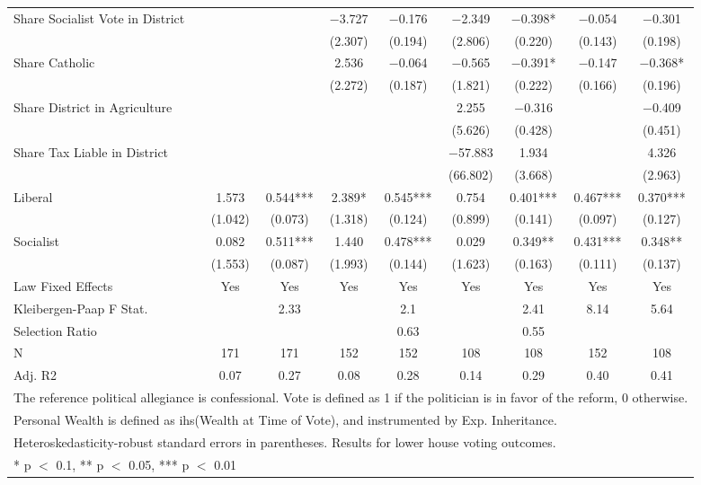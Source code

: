 \begin{table}[!h]
{\begin{tabular}[t]{lcccccccc}
Share Socialist Vote in District &  &  & \num{-3.727} & \num{-0.176} & \num{-2.349} & \num{-0.398}* & \num{-0.054} & \num{-0.301}\\
 &  &  & (\num{2.307}) & (\num{0.194}) & (\num{2.806}) & (\num{0.220}) & (\num{0.143}) & (\num{0.198})\\
Share Catholic &  &  & \num{2.536} & \num{-0.064} & \num{-0.565} & \num{-0.391}* & \num{-0.147} & \num{-0.368}*\\
 &  &  & (\num{2.272}) & (\num{0.187}) & (\num{1.821}) & (\num{0.222}) & (\num{0.166}) & (\num{0.196})\\
Share District in Agriculture &  &  &  &  & \num{2.255} & \num{-0.316} &  & \num{-0.409}\\
 &  &  &  &  & (\num{5.626}) & (\num{0.428}) &  & (\num{0.451})\\
Share Tax Liable in District &  &  &  &  & \num{-57.883} & \num{1.934} &  & \num{4.326}\\
 &  &  &  &  & (\num{66.802}) & (\num{3.668}) &  & (\num{2.963})\\
Liberal & \num{1.573} & \num{0.544}*** & \num{2.389}* & \num{0.545}*** & \num{0.754} & \num{0.401}*** & \num{0.467}*** & \num{0.370}***\\
 & (\num{1.042}) & (\num{0.073}) & (\num{1.318}) & (\num{0.124}) & (\num{0.899}) & (\num{0.141}) & (\num{0.097}) & (\num{0.127})\\
Socialist & \num{0.082} & \num{0.511}*** & \num{1.440} & \num{0.478}*** & \num{0.029} & \num{0.349}** & \num{0.431}*** & \num{0.348}**\\
 & (\num{1.553}) & (\num{0.087}) & (\num{1.993}) & (\num{0.144}) & (\num{1.623}) & (\num{0.163}) & (\num{0.111}) & (\num{0.137})\\
\midrule
Law Fixed Effects & Yes & Yes & Yes & Yes & Yes & Yes & Yes & Yes\\
Kleibergen-Paap F Stat. &  & 2.33 &  & 2.1 &  & 2.41 & 8.14 & 5.64\\
Selection Ratio &  &  &  & 0.63 &  & 0.55 &  & \\
N & \num{171} & \num{171} & \num{152} & \num{152} & \num{108} & \num{108} & \num{152} & \num{108}\\
Adj. R2 & \num{0.07} & \num{0.27} & \num{0.08} & \num{0.28} & \num{0.14} & \num{0.29} & \num{0.40} & \num{0.41}\\
\bottomrule
\multicolumn{9}{l}{\rule{0pt}{1em}The reference political allegiance is confessional. Vote is defined as 1 if the politician is in favor of the reform, 0 otherwise.}\\
\multicolumn{9}{l}{\rule{0pt}{1em}Personal Wealth is defined as ihs(Wealth at Time of Vote), and instrumented by Exp. Inheritance.}\\
\multicolumn{9}{l}{\rule{0pt}{1em}Heteroskedasticity-robust standard errors in parentheses. Results for lower house voting outcomes.}\\
\multicolumn{9}{l}{\rule{0pt}{1em}* p $<$ 0.1, ** p $<$ 0.05, *** p $<$ 0.01}\\
\end{tabular}}
\end{table}